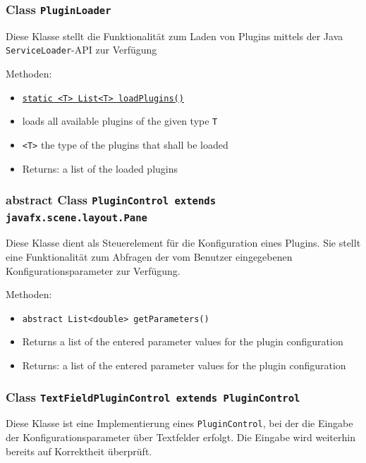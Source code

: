 \documentclass[parskip=full,11pt]{scrartcl}
\begin{document}
\subsubsection{Class \texttt{PluginLoader}}

Diese Klasse stellt die Funktionalität zum Laden von Plugins mittels der Java \texttt{ServiceLoader}-API zur Verfügung

Methoden:

\begin{itemize}\itemsep -10pt
	\item \underline{\texttt{static <T> List<T> loadPlugins()}}
	\item[] loads all available plugins of the given type \texttt{T}
	\item[] \texttt{<T>} the type of the plugins that shall be loaded
	\item[]Returns: a list of the loaded plugins
\end{itemize}

\subsubsection{abstract Class \texttt{PluginControl extends javafx.scene.layout.Pane}}

Diese Klasse dient als Steuerelement für die Konfiguration eines Plugins. Sie stellt eine Funktionalität zum Abfragen der vom Benutzer eingegebenen Konfigurationsparameter zur Verfügung.

Methoden:

\begin{itemize}\itemsep -10pt
	\item \texttt{abstract List<double> getParameters()}
	\item[] Returns a list of the entered parameter values for the plugin configuration
	\item[] Returns: a list of the entered parameter values for the plugin configuration
\end{itemize}

\subsubsection{Class \texttt{TextFieldPluginControl extends PluginControl}}

Diese Klasse ist eine Implementierung eines  \texttt{PluginControl}, bei der die Eingabe der Konfigurationsparameter über Textfelder erfolgt. Die Eingabe wird weiterhin bereits auf Korrektheit überprüft.
\end{document}
